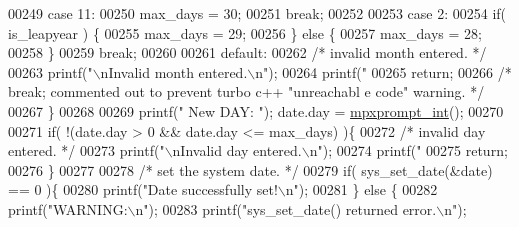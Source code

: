 \begin{DoxyCode}
{{{{{{{{{{{{{00249                         \textcolor{keywordflow}{case} 11:
00250                                 max\_days = 30;
00251                         \textcolor{keywordflow}{break};
00252 
00253                         \textcolor{keywordflow}{case} 2:
00254                                 \textcolor{keywordflow}{if}( is\_leapyear ) \{
00255                                         max\_days = 29;
00256                                 \} \textcolor{keywordflow}{else} \{
00257                                         max\_days = 28;
00258                                 \}
00259                         \textcolor{keywordflow}{break};
00260 
00261                         \textcolor{keywordflow}{default}:
00262                                 \textcolor{comment}{/* invalid month entered. */}
00263                                 printf(\textcolor{stringliteral}{"\(\backslash\)nInvalid month entered.\(\backslash\)n"});
00264                                 printf(\textcolor{stringliteral}{"%
00265                                 \textcolor{keywordflow}{return};
00266                         \textcolor{comment}{/* break;  commented out to prevent turbo c++ "unreachabl
      e code" warning. */}
00267                 \}
00268 
00269                 printf(\textcolor{stringliteral}{"  New DAY:   "}); date.day       = \hyperlink{mpx__util_8c_aacc3dfe470919b0bd1133bce90383e18}{mpxprompt_int}();
00270 
00271                 \textcolor{keywordflow}{if}( !(date.day > 0 && date.day <= max\_days) )\{
00272                         \textcolor{comment}{/* invalid day entered. */}
00273                         printf(\textcolor{stringliteral}{"\(\backslash\)nInvalid day entered.\(\backslash\)n"});
00274                         printf(\textcolor{stringliteral}{"%
00275                         \textcolor{keywordflow}{return};
00276                 \}
00277 
00278                 \textcolor{comment}{/* set the system date. */}
00279                 \textcolor{keywordflow}{if}( sys\_set\_date(&date) == 0 )\{
00280                         printf(\textcolor{stringliteral}{"Date successfully set!\(\backslash\)n"});
00281                 \} \textcolor{keywordflow}{else} \{
00282                         printf(\textcolor{stringliteral}{"WARNING:\(\backslash\)n"});
00283                         printf(\textcolor{stringliteral}{"sys\_set\_date() returned error.\(\backslash\)n"});
}}}}}}}}}}}}}}}
\end{DoxyCode}
